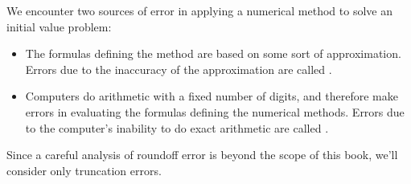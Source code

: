 \documentclass{ximera}
\begin{document}
We encounter two sources of error
in applying a numerical method to solve an initial value problem:
\begin{itemize}
\item
The formulas defining the method are based on some sort of
approximation. Errors due to the inaccuracy of the approximation are
called .
\item
Computers do arithmetic with a fixed number of digits, and therefore
make errors in evaluating the formulas defining the numerical methods.
Errors due to the computer's inability to do exact arithmetic are
called .
\end{itemize}

Since a careful analysis of roundoff error is beyond the scope of this
book, we'll consider only truncation errors.
\end{document}
